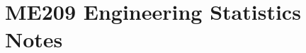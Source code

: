 \documentclass{article}
\begin{document}
	\section*{ME209 Engineering Statistics Notes}
	
	

    \newpage

    
	
	
\end{document}
